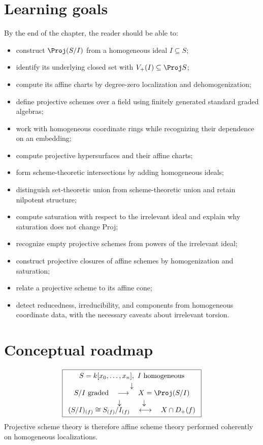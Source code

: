 \section*{Learning goals}
By the end of the chapter, the reader should be able to:
\begin{itemize}
\item construct \(\Proj(S/I)\) from a homogeneous ideal \(I\subseteq S\);
\item identify its underlying closed set with \(V_+(I)\subseteq\Proj S\);
\item compute its affine charts by degree-zero localization and dehomogenization;
\item define projective schemes over a field using finitely generated standard graded algebras;
\item work with homogeneous coordinate rings while recognizing their dependence on an embedding;
\item compute projective hypersurfaces and their affine charts;
\item form scheme-theoretic intersections by adding homogeneous ideals;
\item distinguish set-theoretic union from scheme-theoretic union and retain nilpotent structure;
\item compute saturation with respect to the irrelevant ideal and explain why saturation does not change Proj;
\item recognize empty projective schemes from powers of the irrelevant ideal;
\item construct projective closures of affine schemes by homogenization and saturation;
\item relate a projective scheme to its affine cone;
\item detect reducedness, irreducibility, and components from homogeneous coordinate data, with the necessary caveats about irrelevant torsion.
\end{itemize}

\section*{Conceptual roadmap}
\[
\boxed{
\begin{array}{c}
S=k[x_0,\ldots,x_n],\ I\ \text{homogeneous}\\[2pt]
\downarrow\\[-2pt]
S/I\ \text{graded}\quad\longrightarrow\quad X=\Proj(S/I)\\[2pt]
\downarrow\quad\quad\quad\downarrow\\[-2pt]
(S/I)_{(f)}\cong S_{(f)}/I_{(f)}\quad\longleftrightarrow\quad X\cap D_+(f)
\end{array}}
\]
Projective scheme theory is therefore affine scheme theory performed coherently on homogeneous localizations.

